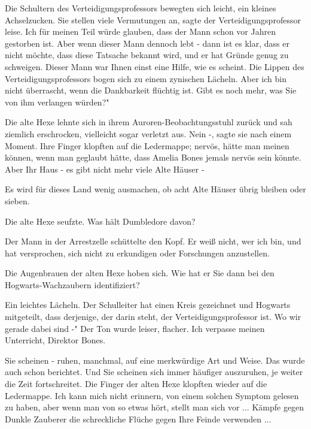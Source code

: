 Die Schultern des Verteidigungsprofessors bewegten sich leicht, ein kleines
Achselzucken. \glqq{}Sie stellen viele Vermutungen an\grqq{}, sagte der
Verteidigungsprofessor leise. \glqq{}Ich für meinen Teil würde glauben, dass der
Mann schon vor Jahren gestorben ist. Aber wenn dieser Mann dennoch lebt - dann
ist es klar, dass er nicht möchte, dass diese Tatsache bekannt wird, und er hat
Gründe genug zu schweigen. Dieser Mann war Ihnen einst eine Hilfe, wie es
scheint.\grqq{} Die Lippen des Verteidigungsprofessors bogen sich zu einem
zynischen Lächeln. \glqq{}Aber ich bin nicht überrascht, wenn die Dankbarkeit
flüchtig ist. Gibt es noch mehr, was Sie von ihm verlangen würden?"

Die alte Hexe lehnte sich in ihrem Auroren-Beobachtungsstuhl zurück und sah
ziemlich erschrocken, vielleicht sogar verletzt aus. \glqq{}Nein -\grqq{}, sagte
sie nach einem Moment. Ihre Finger klopften auf die Ledermappe; nervös, hätte
man meinen können, wenn man geglaubt hätte, dass Amelia Bones jemals nervös sein
könnte. \glqq{}Aber Ihr Haus - es gibt nicht mehr viele Alte Häuser -\grqq{}

\glqq{}Es wird für dieses Land wenig ausmachen, ob acht Alte Häuser übrig bleiben
oder sieben.\grqq{}

Die alte Hexe seufzte. \glqq{}Was hält Dumbledore davon?\grqq{}

Der Mann in der Arrestzelle schüttelte den Kopf. \glqq{}Er weiß nicht, wer ich
bin, und hat versprochen, sich nicht zu erkundigen oder Forschungen
anzustellen.\grqq{}

Die Augenbrauen der alten Hexe hoben sich. \glqq{}Wie hat er Sie dann bei den
Hogwarts-Wachzaubern identifiziert?\grqq{}

Ein leichtes Lächeln. \glqq{}Der Schulleiter hat einen Kreis gezeichnet und
Hogwarts mitgeteilt, dass derjenige, der darin steht, der Verteidigungsprofessor
ist. Wo wir gerade dabei sind -" Der Ton wurde leiser, flacher. \glqq{}Ich
verpasse meinen Unterricht, Direktor Bones.\grqq{}

\glqq{}Sie scheinen - ruhen, manchmal, auf eine merkwürdige Art und Weise. Das
wurde auch schon berichtet. Und Sie scheinen sich immer häufiger auszuruhen, je
weiter die Zeit fortschreitet.\grqq{} Die Finger der alten Hexe klopften wieder
auf die Ledermappe. \glqq{}Ich kann mich nicht erinnern, von einem solchen
Symptom gelesen zu haben, aber wenn man von so etwas hört, stellt man sich vor
... Kämpfe gegen Dunkle Zauberer die schreckliche Flüche gegen Ihre Feinde
verwenden ...\grqq{}


